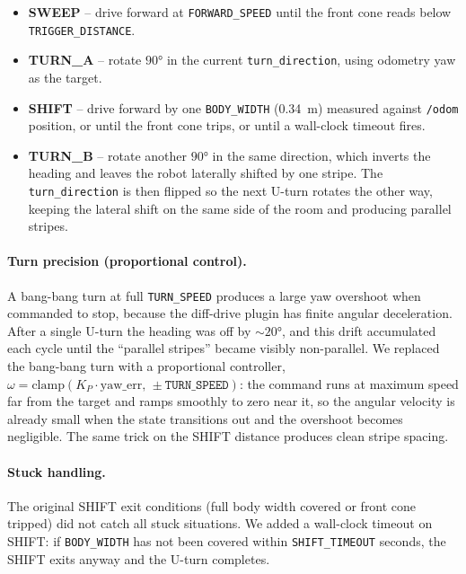 \documentclass[12pt, a4paper]{article}
\begin{document}
\begin{itemize}
    \item \textbf{SWEEP} -- drive forward at \texttt{FORWARD\_SPEED} until the
          front cone reads below \newline \texttt{TRIGGER\_DISTANCE}.
    \item \textbf{TURN\_A} -- rotate $90°$ in the current
          \texttt{turn\_direction}, using odometry yaw as the target.
    \item \textbf{SHIFT} -- drive forward by one \texttt{BODY\_WIDTH} (0.34~m)
          measured against \texttt{/odom} position, or until the front cone
          trips, or until a wall-clock timeout fires.
    \item \textbf{TURN\_B} -- rotate another $90°$ in the same direction,
          which inverts the heading and leaves the robot laterally shifted by
          one stripe.  The \texttt{turn\_direction} is then flipped so the
          next U-turn rotates the other way, keeping the lateral shift on the
          same side of the room and producing parallel stripes.
\end{itemize}

\paragraph{Turn precision (proportional control).}
A bang-bang turn at full \texttt{TURN\_SPEED} produces a large yaw overshoot
when commanded to stop, because the diff-drive plugin has finite angular
deceleration.  After a single U-turn the heading was off by ${\sim}20°$, and
this drift accumulated each cycle until the ``parallel stripes'' became visibly
non-parallel.  We replaced the bang-bang turn with a proportional controller,
$\omega = \mathrm{clamp}(K_P \cdot \mathrm{yaw\_err},\,\pm \texttt{TURN\_SPEED})$:
the command runs at maximum speed far from the target and ramps smoothly to
zero near it, so the angular velocity is already small when the state
transitions out and the overshoot becomes negligible.  The same trick on the
SHIFT distance produces clean stripe spacing.

\paragraph{Stuck handling.}
The original SHIFT exit conditions (full body width covered or front cone
tripped) did not catch all stuck situations. We added a wall-clock
timeout on SHIFT: if \texttt{BODY\_WIDTH} has not been covered within
\texttt{SHIFT\_TIMEOUT} seconds, the SHIFT exits anyway and the U-turn
completes.
\end{document}

